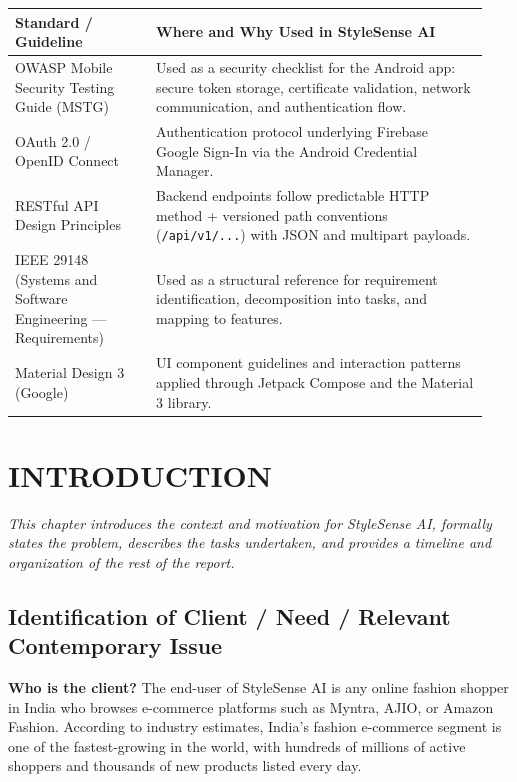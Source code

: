 \documentclass[12pt,a4paper]{report}
\newcommand{\ProjectShort}{StyleSense AI}
\begin{document}
\vspace{8pt}
\begin{adjustbox}{max width=\linewidth}
\begin{tabular}{L{0.28\linewidth} L{0.66\linewidth}}
\toprule
\textbf{Standard / Guideline} & \textbf{Where and Why Used in \ProjectShort{}} \\
\midrule
OWASP Mobile Security Testing Guide (MSTG)
  & Used as a security checklist for the Android app: secure token storage,
    certificate validation, network communication, and authentication flow. \\
OAuth 2.0 / OpenID Connect
  & Authentication protocol underlying Firebase Google Sign-In via the
    Android Credential Manager. \\
RESTful API Design Principles
  & Backend endpoints follow predictable HTTP method + versioned path
    conventions (\texttt{/api/v1/...}) with JSON and multipart payloads. \\
IEEE 29148 (Systems and Software Engineering --- Requirements)
  & Used as a structural reference for requirement identification, decomposition
    into tasks, and mapping to features. \\
Material Design 3 (Google)
  & UI component guidelines and interaction patterns applied through
    Jetpack Compose and the Material 3 library. \\
\bottomrule
\end{tabular}
\end{adjustbox}

\clearpage
{}

\chapter{INTRODUCTION}

\textit{This chapter introduces the context and motivation for \ProjectShort{}, formally states the problem, describes the tasks undertaken, and provides a timeline and organization of the rest of the report.}

\section{Identification of Client / Need / Relevant Contemporary Issue}

\textbf{Who is the client?} The end-user of \ProjectShort{} is any online fashion shopper in India who browses e-commerce platforms such as Myntra, AJIO, or Amazon Fashion. According to industry estimates, India's fashion e-commerce segment is one of the fastest-growing in the world, with hundreds of millions of active shoppers and thousands of new products listed every day.
\end{document}
